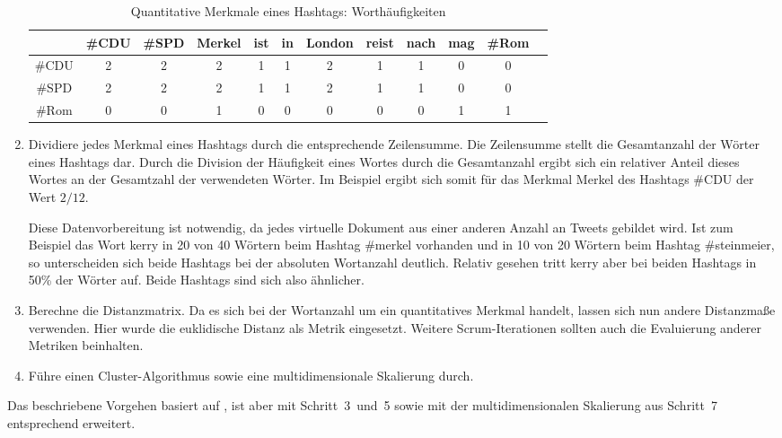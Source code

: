 \begin{enumerate}
\begin{table}[ht]
\centering
\small
\begin{tabular}{cccccccccccc}
\toprule
 & \#CDU & \#SPD  & Merkel & ist & in & London & reist & nach & mag & \#Rom \\ 
\midrule
\#CDU & 2 & 2  & 2 & 1 & 1 & 2 & 1 & 1 & 0 & 0\\ 

\#SPD & 2 & 2  & 2 & 1 & 1 & 2 & 1 & 1 & 0 & 0\\ 

\#Rom & 0 & 0  & 1 & 0 & 0 & 0 & 0 & 0 & 1 & 1\\ 
\bottomrule 
\end{tabular} 
\caption{Quantitative Merkmale eines Hashtags: Worthäufigkeiten}
\label{fig:ClusterTab3}
\end{table}

%
%
\item Dividiere jedes Merkmal eines Hashtags durch die entsprechende Zeilensumme.
Die Zeilensumme stellt die Gesamtanzahl der Wörter eines Hashtags dar. Durch die Division der Häufigkeit eines Wortes durch die Gesamtanzahl ergibt sich ein relativer Anteil dieses Wortes an der Gesamtzahl der verwendeten Wörter. Im Beispiel ergibt sich somit für das Merkmal \glqq Merkel\grqq{} des Hashtags \glqq \#CDU\grqq{} der Wert $2/12$.

Diese Datenvorbereitung ist notwendig, da jedes virtuelle Dokument aus einer anderen Anzahl an Tweets gebildet wird. Ist zum Beispiel das Wort \glqq kerry\grqq{} in 20 von 40 Wörtern beim Hashtag \glqq \#merkel\grqq{} vorhanden und in 10 von 20 Wörtern beim Hashtag \glqq \#steinmeier\grqq{}, so unterscheiden sich beide Hashtags bei der absoluten Wortanzahl deutlich. Relativ gesehen tritt \glqq kerry\grqq{} aber bei beiden Hashtags in 50\% der Wörter auf. Beide Hashtags sind sich also ähnlicher.
%
%
\item Berechne die Distanzmatrix. Da es sich bei der Wortanzahl um ein quantitatives Merkmal handelt, lassen sich nun andere Distanzmaße verwenden. Hier wurde die euklidische Distanz als Metrik eingesetzt. Weitere Scrum-Iterationen sollten auch die Evaluierung anderer Metriken beinhalten. 
%
\item Führe einen Cluster-Algorithmus sowie eine multidimensionale Skalierung durch.
\end{enumerate}
Das beschriebene Vorgehen basiert auf \cite{TsurLittman}, ist aber mit Schritt~3~und~5 sowie mit der multidimensionalen Skalierung aus Schritt~7 entsprechend erweitert. 

